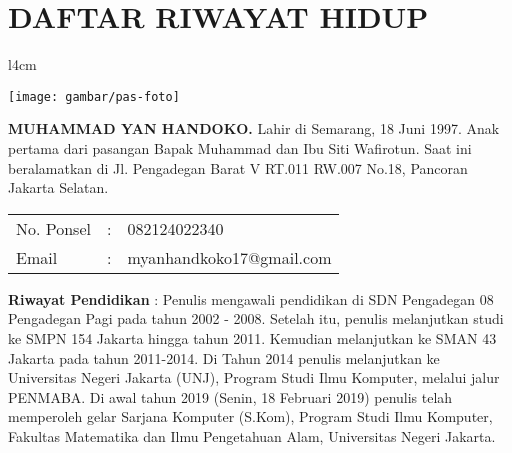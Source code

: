 \pagestyle{empty}
\chapter*{\centering \large DAFTAR RIWAYAT HIDUP}
\thispagestyle{empty}

\begin{wrapfigure}{l}{4cm}
	\vspace{-25pt}
	\begin{center}
		\texttt{[image: gambar/pas-foto]}
	\end{center}
	\vspace{-80pt}
\end{wrapfigure}

\noindent \textbf{MUHAMMAD YAN HANDOKO.}  Lahir di Semarang, 18 Juni 1997.  Anak pertama dari pasangan Bapak Muhammad dan Ibu Siti Wafirotun. Saat ini beralamatkan di Jl. Pengadegan Barat V RT.011 RW.007 No.18, Pancoran Jakarta Selatan.

\vspace{0.5cm}
\noindent
\begin{center}
	\begin{flushright}
		\begin{tabular}{lcl}
			No. Ponsel	& :&  082124022340 \\
			Email	& :&  myanhandkoko17@gmail.com
		\end{tabular}
	\end{flushright}
\end{center}
\vspace{0.5cm}

\noindent \textbf{Riwayat Pendidikan} : Penulis mengawali pendidikan di SDN Pengadegan 08 Pengadegan Pagi pada tahun 2002 - 2008. Setelah itu, penulis melanjutkan studi ke SMPN 154 Jakarta hingga tahun 2011. Kemudian melanjutkan ke SMAN 43 Jakarta pada tahun 2011-2014. Di Tahun 2014 penulis melanjutkan ke Universitas Negeri Jakarta (UNJ), Program Studi Ilmu Komputer, melalui jalur PENMABA. Di awal tahun 2019 (Senin, 18 Februari 2019) penulis telah memperoleh gelar Sarjana Komputer (S.Kom), Program Studi Ilmu Komputer, Fakultas Matematika dan Ilmu Pengetahuan Alam, Universitas Negeri Jakarta.

